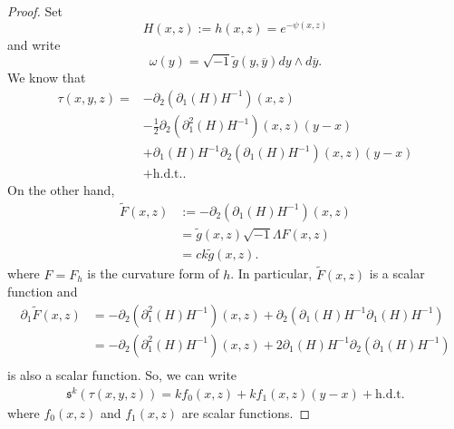 \documentclass{amsart}
\theoremstyle{definition}
\theoremstyle{remark}
\numberwithin{equation}{section}
\begin{document}
\begin{proof}
Set 
\begin{equation*}
H(x,z) := h(x,z) = e^{-\psi(x,z)}
\end{equation*}
and write
\begin{equation*}
    \omega(y) = \sqrt{-1} \tilde{g}(y,\overline{y}) dy \wedge d\overline{y}.
\end{equation*}
We know that
\begin{equation*}
\begin{split}
    \tau(x,y,z) = &  - \partial_2(\partial_1 (H) {H}^{-1})(x,z) \\
    & - \frac{1}{2} \partial_2(\partial_1^2(H) {H}^{-1})(x,z)(y-x)  \\
    & + \partial_1(H) {H}^{-1} \partial_2(\partial_1(H) {H}^{-1})(x,z)(y-x) \\
    & + \text{h.d.t.}.
\end{split}
\end{equation*}
On the other hand,
\begin{equation*}
\begin{split}
    \tilde{F}(x,z) & := -\partial_2(\partial_1 (H){H}^{-1})(x,z) \\
    & = \tilde{g}(x,z) \sqrt{-1} \Lambda F(x,z) \\
    & =  c k \tilde{g}(x,z).
\end{split}
\end{equation*}
where $F = F_{h}$ is the curvature form of $h$. In particular, $\tilde{F}(x,z)$ is a scalar function and 
\begin{equation*}
    \begin{split}
        \partial_1 \tilde{F}(x,z) & = -\partial_2(\partial_1^2 (H){H}^{-1})(x,z) + \partial_2 (\partial_1 (H){H}^{-1} \partial_1(H) {H}^{-1})  \\
        & = -\partial_2(\partial_1^2 (H){H}^{-1})(x,z) + 2 \partial_1 (H){H}^{-1} \partial_2 (\partial_1(H) {H}^{-1})  \\
\end{split}
\end{equation*}
is also a scalar function. So, we can write
\begin{equation*}
\begin{split}
    \mathfrak{s}^k(\tau(x,y,z)) =   kf_0(x,z) + kf_1(x,z) (y-x) + \text{h.d.t.}
\end{split}
\end{equation*}
where $f_0(x,z)$ and $f_1(x,z)$ are scalar functions. 




\end{proof}
\end{document}
